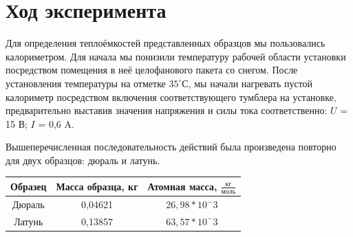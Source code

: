 \documentclass[a4paper,12pt]{article}
\begin{document}
\section{Ход эксперимента}
\hspace{\parindent}Для определения теплоёмкостей представленных образцов мы пользовались калориметром. Для начала мы понизили температуру рабочей области установки посредством помещения в неё целофанового пакета со снегом. После установления температуры на отметке $35^\circ С$, мы начали нагревать пустой калориметр посредством включения соответствующего тумблера на установке, предварительно выставив значения напряжения и силы тока соответственно: $U$ = 15 В; $I$ = 0,6 A.

Вышеперечисленная последовательность действий была произведена повторно для двух образцов: дюраль и латунь.
\begin{center}
\end{center}


\begin{center}
	\begin{tabular}{|c|c|c|}
		\hline
		Образец&	Масса образца, кг& Атомная масса, $\frac{кг}{моль}$
		\\
		\hline
		Дюраль&	0,04621& $26,98*10^-3$
		\\
		Латунь&	0,13857& $63,57*10^-3$
		\\
		\hline		
	\end{tabular}
\end{center}
\end{document}
